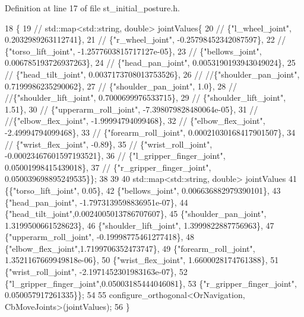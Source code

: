 Definition at line 17 of file st\+\_\+initial\+\_\+posture.\+h.


\begin{DoxyCode}
18     \{
19         \textcolor{comment}{// std::map<std::string, double> jointValues\{}
20         \textcolor{comment}{//     \{"l\_wheel\_joint", 0.2032989263112741\},}
21         \textcolor{comment}{//     \{"r\_wheel\_joint", -0.25798452342087597\},}
22         \textcolor{comment}{//     \{"torso\_lift\_joint", -1.2577603815717127e-05\},}
23         \textcolor{comment}{//     \{"bellows\_joint", 0.006785193726937263\},}
24         \textcolor{comment}{//     \{"head\_pan\_joint", 0.0053190193943049024\},}
25         \textcolor{comment}{//     \{"head\_tilt\_joint", 0.0037173708013753526\},}
26         \textcolor{comment}{//     //\{"shoulder\_pan\_joint", 0.7199986235290062\},}
27         \textcolor{comment}{//     \{"shoulder\_pan\_joint", 1.0\},}
28         \textcolor{comment}{//     //\{"shoulder\_lift\_joint", 0.7000699976533715\},}
29         \textcolor{comment}{//     \{"shoulder\_lift\_joint", 1.51\},}
30         \textcolor{comment}{//     \{"upperarm\_roll\_joint", -7.398079828480064e-05\},}
31         \textcolor{comment}{//     //\{"elbow\_flex\_joint", -1.99994794099468\},}
32         \textcolor{comment}{//     \{"elbow\_flex\_joint", -2.49994794099468\},}
33         \textcolor{comment}{//     \{"forearm\_roll\_joint", 0.00021030168417901507\},}
34         \textcolor{comment}{//     \{"wrist\_flex\_joint", -0.89\},}
35         \textcolor{comment}{//     \{"wrist\_roll\_joint", -0.00023467601597193521\},}
36         \textcolor{comment}{//     \{"l\_gripper\_finger\_joint", 0.05001998415439018\},}
37         \textcolor{comment}{//     \{"r\_gripper\_finger\_joint", 0.050039698895249535\}\};}
38 
39 
40     std::map<std::string, double> jointValues
41        \{\{\textcolor{stringliteral}{"torso\_lift\_joint"}, 0.05\},
42         \{\textcolor{stringliteral}{"bellows\_joint"}, 0.006636882979390101\},
43         \{\textcolor{stringliteral}{"head\_pan\_joint"}, -1.7973139598836951e-07\},
44         \{\textcolor{stringliteral}{"head\_tilt\_joint"},0.0024005013786707607\},
45         \{\textcolor{stringliteral}{"shoulder\_pan\_joint"}, 1.3199500661528623\},
46         \{\textcolor{stringliteral}{"shoulder\_lift\_joint"}, 1.3999822887756963\},
47         \{\textcolor{stringliteral}{"upperarm\_roll\_joint"}, -0.19998775461277418\},
48         \{\textcolor{stringliteral}{"elbow\_flex\_joint"},1.7199706352473747\},
49         \{\textcolor{stringliteral}{"forearm\_roll\_joint"}, 1.3521167669949818e-06\},
50         \{\textcolor{stringliteral}{"wrist\_flex\_joint"}, 1.6600028174761388\},
51         \{\textcolor{stringliteral}{"wrist\_roll\_joint"}, -2.1971452301983163e-07\},
52         \{\textcolor{stringliteral}{"l\_gripper\_finger\_joint"},0.05003185444046081\},
53         \{\textcolor{stringliteral}{"r\_gripper\_finger\_joint"}, 0.050057917261335\}\};
54 
55         configure\_orthogonal<OrNavigation, CbMoveJoints>(jointValues);
56     \}
\end{DoxyCode}


